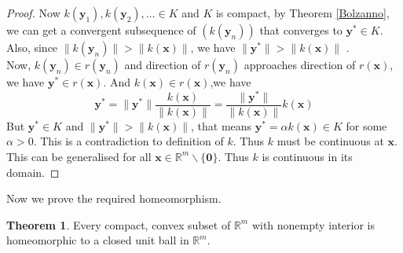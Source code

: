 \documentclass{article}
\theoremstyle{definition}
\newtheorem{theorem}{Theorem}[section]
\begin{document}
\begin{proof}
Now $k(\mathbf{y}_1),k(\mathbf{y}_2),\dots \in K$ and $K$ is compact, by Theorem \ref{Bolzanno}, we can get a convergent subsequence of $(k(\mathbf{y}_n))$ that converges to $\mathbf{y}^*\in K$. Also, since $\|k(\mathbf{y}_n)\|> \|k(\mathbf{x})\|$, we have $\|\mathbf{y}^*\|> \|k(\mathbf{x})\|$ .\\
Now, $k(\mathbf{y}_n) \in r(\mathbf{y}_n)$ and direction of $r(\mathbf{y}_n)$ approaches direction of $r(\mathbf{x})$, we have $\mathbf{y}^* \in r(\mathbf{x})$. And $k(\mathbf{x}) \in r(\mathbf{x})$,we have $$\mathbf{y}^* = \|\mathbf{y}^*\| \frac{k(\mathbf{x})}{\|k(\mathbf{x})\|} = \frac{\|\mathbf{y}^*\|}{\|k(\mathbf{x})\|}k(\mathbf{x})$$ But $\mathbf{y}^*\in K$ and $\|\mathbf{y}^*\|> \|k(\mathbf{x})\|$, that means $\mathbf{y}^* = \alpha k(\mathbf{x}) \in K$ for some $\alpha>0$. This is a contradiction to definition of $k$. Thus $k$ must be continuous at $\mathbf{x}$. This can be generalised for all $\mathbf{x} \in \mathbb{R}^m \backslash \{\mathbf{0}\}$. Thus $k$ is continuous in its domain.
\end{proof}
Now we prove the required homeomorphism.
\begin{theorem}
\label{Homeo}
Every compact, convex subset of $\mathbb{R}^m$ with nonempty interior is homeomorphic to a closed unit ball in $\mathbb{R}^m$.
\end{theorem}
\end{document}
